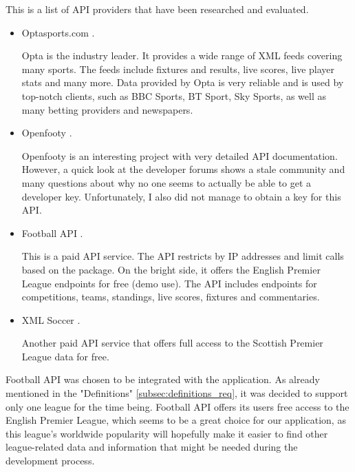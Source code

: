 This is a list of API providers that have been researched and evaluated.
	
\begin{itemize}
	\item Optasports.com \citep{source:opta}.\par
Opta is the industry leader. It provides a wide range of XML feeds covering many sports. The feeds include fixtures and results, live scores, live player stats and many more. Data provided by Opta is very reliable and is used by top-notch clients, such as BBC Sports, BT Sport, Sky Sports, as well as many betting providers and newspapers.		
	\item Openfooty \citep{source:openfooty}.\par
	Openfooty is an interesting project with very detailed API documentation. However, a quick look at the developer forums shows a stale community and many questions about why no one seems to actually be able to get a developer key. Unfortunately, I also did not manage to obtain a key for this API.			
	\item Football API \citep{source:footballapi} .\par
This is a paid API service. The API restricts by IP addresses and limit calls based on the package. On the bright side, it offers the English Premier League endpoints for free (demo use). The API includes endpoints for competitions, teams, standings, live scores, fixtures and commentaries.	
	\item XML Soccer \citep{source:xmlsoccer}. \par
	Another paid API service that offers full access to the Scottish Premier League data for free.
		
\end{itemize}
	
Football API was chosen to be integrated with the application. As already mentioned in the "Definitions" \ref{subsec:definitions_req}, it was decided to support only one league for the time being. Football API offers its users free access to the English Premier League, which seems to be a great choice for our application, as this league's worldwide popularity will hopefully make it easier to find other league-related data and information that might be needed during the development process.